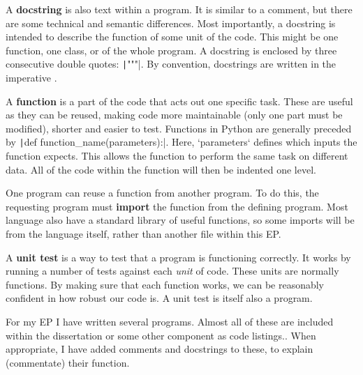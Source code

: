 \documentclass[a4paper,11pt]{article}
\begin{document}
    \begin{definition}
    A \textbf{docstring} is also text within a program. It is similar to a
    comment, but there are some technical and semantic differences. Most
    importantly, a docstring is intended to describe the function of some unit
    of the code. This might be one function, one class, or of the whole program.
    A docstring is enclosed by three consecutive double quotes:
    \texttt|"""|. By convention, docstrings are written in the
    imperative \citep*{PEPDocstrings2014Goodger}.
    \end{definition}

    \begin{definition}
    A \textbf{function} is a part of the code that acts out one specific task.
    These are useful as they can be reused, making code more maintainable (only
    one part must be modified), shorter and easier to test. Functions in Python
    are generally preceded by \texttt|def
    function_name(parameters):|.  Here, `parameters` defines which inputs the
    function expects. This allows the function to perform the same task on
    different data. All of the code within the function will then be indented
    one level.
    \end{definition}

    \begin{definition}
    One program can reuse a function from another program. To do this, the
    requesting program must \textbf{import} the function from the defining
    program. Most language also have a standard library of useful functions, so
    some imports will be from the language itself, rather than another file
    within this EP.
    \end{definition}

    \begin{definition}
    A \textbf{unit test} is a way to test that a program is functioning
    correctly. It works by running a number of tests against each \textit{unit}
    of code. These units are normally functions. By making sure that each
    function works, we can be reasonably confident in how robust our code is. A
    unit test is itself also a program.
    \end{definition}

    For my EP I have written several programs. Almost all of these are included
    within the dissertation or some other component as code listings.. When
    appropriate, I have added comments and docstrings to these, to explain
    (commentate) their function.
\end{document}
